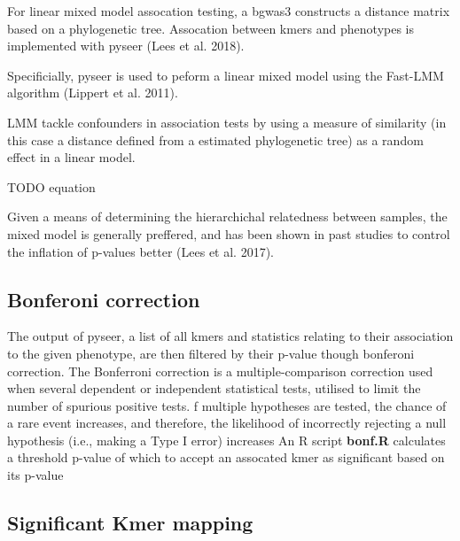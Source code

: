\documentclass[]{DissertateUSU}
\begin{document}
For linear mixed model assocation testing, a bgwas3 constructs a
distance matrix based on a phylogenetic tree. Assocation between kmers
and phenotypes is implemented with pyseer (Lees et al. 2018).

Specificially, pyseer is used to peform a linear mixed model using the
Fast-LMM algorithm (Lippert et al. 2011).

LMM tackle confounders in association tests by using a measure of
similarity (in this case a distance defined from a estimated
phylogenetic tree) as a random effect in a linear model.

TODO equation

Given a means of determining the hierarchichal relatedness between
samples, the mixed model is generally preffered, and has been shown in
past studies to control the inflation of p-values better (Lees et al.
2017).

\hypertarget{bonferoni-correction}{%
\subsection{Bonferoni correction}\label{bonferoni-correction}}

The output of pyseer, a list of all kmers and statistics relating to
their association to the given phenotype, are then filtered by their
p-value though bonferoni correction. The Bonferroni correction is a
multiple-comparison correction used when several dependent or
independent statistical tests, utilised to limit the number of spurious
positive tests. f multiple hypotheses are tested, the chance of a rare
event increases, and therefore, the likelihood of incorrectly rejecting
a null hypothesis (i.e., making a Type I error) increases An R script
\textbf{bonf.R} calculates a threshold p-value of which to accept an
assocated kmer as significant based on its p-value

\hypertarget{significant-kmer-mapping}{%
\subsection{Significant Kmer mapping}\label{significant-kmer-mapping}}
\end{document}
